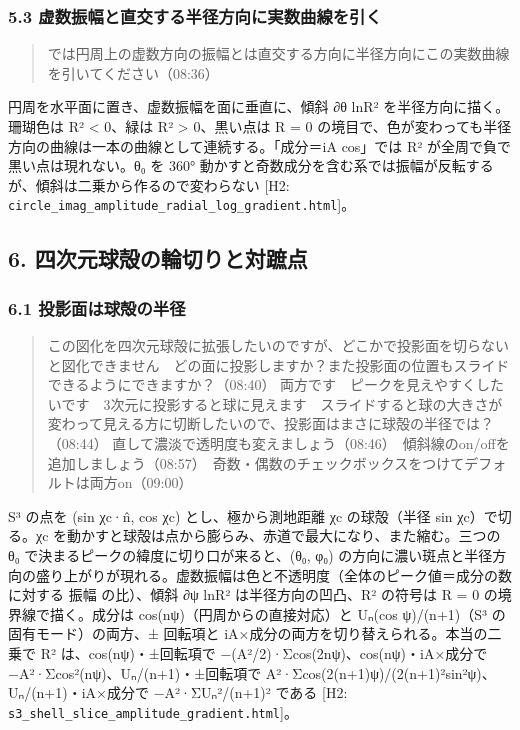 \documentclass[
  a4paper,
]{ltjsarticle}
\begin{document}
\subsubsection{5.3
虚数振幅と直交する半径方向に実数曲線を引く}\label{ux865aux6570ux632fux5e45ux3068ux76f4ux4ea4ux3059ux308bux534aux5f84ux65b9ux5411ux306bux5b9fux6570ux66f2ux7ddaux3092ux5f15ux304f}

\begin{quote}
では円周上の虚数方向の振幅とは直交する方向に半径方向にこの実数曲線を引いてください（08:36）
\end{quote}

円周を水平面に置き、虚数振幅を面に垂直に、傾斜 ∂θ
ln\textbar R²\textbar{} を半径方向に描く。珊瑚色は R² \textless{}
0、緑は R² \textgreater{} 0、黒い点は R = 0
の境目で、色が変わっても半径方向の曲線は一本の曲線として連続する。「成分＝iA
cos」では R² が全周で負で黒い点は現れない。θ₀ を 360°
動かすと奇数成分を含む系では振幅が反転するが、傾斜は二乗から作るので変わらない
{[}H2: \texttt{circle\_\allowbreak{}imag\_\allowbreak{}amplitude\_\allowbreak{}radial\_\allowbreak{}log\_\allowbreak{}gradient.html}{]}。

\subsection{6.
四次元球殻の輪切りと対蹠点}\label{ux56dbux6b21ux5143ux7403ux6bbbux306eux8f2aux5207ux308aux3068ux5bfeux8e60ux70b9}

\subsubsection{6.1
投影面は球殻の半径}\label{ux6295ux5f71ux9762ux306fux7403ux6bbbux306eux534aux5f84}

\begin{quote}
この図化を四次元球殻に拡張したいのですが、どこかで投影面を切らないと図化できません　どの面に投影しますか？また投影面の位置もスライドできるようにできますか？（08:40）
両方です　ピークを見えやすくしたいです　3次元に投影すると球に見えます　スライドすると球の大きさが変わって見える方に切断したいので、投影面はまさに球殻の半径では？（08:44）
直して濃淡で透明度も変えましょう（08:46）　傾斜線のon/offを追加しましょう（08:57）　奇数・偶数のチェックボックスをつけてデフォルトは両方on（09:00）
\end{quote}

S³ の点を (sin χc·n̂, cos χc) とし、極から測地距離 χc の球殻（半径 sin
χc）で切る。χc
を動かすと球殻は点から膨らみ、赤道で最大になり、また縮む。三つの θ₀
で決まるピークの緯度に切り口が来ると、(θ₀, φ₀)
の方向に濃い斑点と半径方向の盛り上がりが現れる。虚数振幅は色と不透明度（全体のピーク値＝成分の数に対する
\textbar 振幅\textbar{} の比）、傾斜 ∂ψ ln\textbar R²\textbar{}
は半径方向の凹凸、R² の符号は R = 0 の境界線で描く。成分は
cos(nψ)（円周からの直接対応）と Uₙ(cos ψ)/(n+1)（S³
の固有モード）の両方、± 回転項と
iA×成分の両方を切り替えられる。本当の二乗で R² は、cos(nψ)・±回転項で
−(A²/2)·Σcos(2nψ)、cos(nψ)・iA×成分で −A²·Σcos²(nψ)、Uₙ/(n+1)・±回転項で
A²·Σcos(2(n+1)ψ)/(2(n+1)²sin²ψ)、Uₙ/(n+1)・iA×成分で −A²·ΣUₙ²/(n+1)²
である {[}H2: \texttt{s3\_\allowbreak{}shell\_\allowbreak{}slice\_\allowbreak{}amplitude\_\allowbreak{}gradient.html}{]}。
\end{document}
